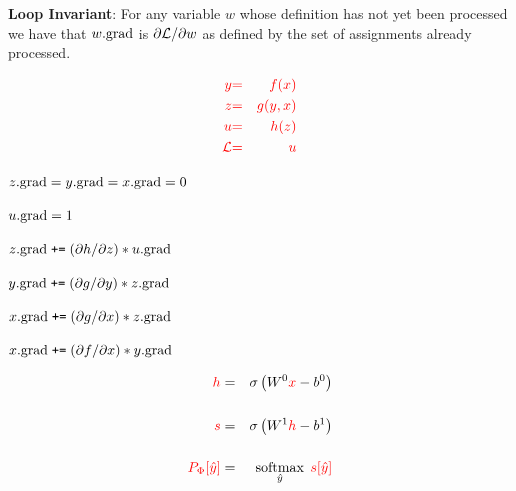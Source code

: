 {{}

\medskip
    {\bf Loop Invariant}: For any variable $w$ whose definition has not yet been processed we have that $w.\mathrm{grad}$ is $\partial {\cal L}/\partial w$ as defined by the set of assignments already processed.

\vspace{-3ex}
\begin{eqnarray*}
  {\color{red} y} & {\color{red} =} & {\color{red} f(x)} \\
  {\color{red} z} & {\color{red} =} & {\color{red} g(y,x)} \\
  {\color{red} u} & {\color{red} =} & {\color{red} h(z)} \\
  {\color{red} {\cal L}} & {\color{red} =} & {\color{red} u}
\end{eqnarray*}
{\color{red}
\medskip
$z.\mathrm{grad} = y.\mathrm{grad} = x.\mathrm{grad} = 0$

\medskip
$u.\mathrm{grad} = 1$

\medskip
$z.\mathrm{grad}\;\mbox{\tt +=}\; ({\partial h}/{\partial z}) * u.\mathrm{grad}$

\medskip
$y.\mathrm{grad} \;\mbox{\tt +=}\; ({\partial g}/{\partial y}) * z.\mathrm{grad}$

\medskip
$x.\mathrm{grad} \;\mbox{\tt +=}\; ({\partial g}/{\partial x}) * z.\mathrm{grad}$

\medskip
$x.\mathrm{grad} \;\mbox{\tt +=}\; ({\partial f}/{\partial x}) * y.\mathrm{grad}$
}



\begin{eqnarray*}
  {\color{red} h} & = & \sigma\left(W^0{\color{red} x} - b^0\right) \\
  \\
  {\color{red} s} & = & \sigma\left(W^1{\color{red} h} - b^1 \right) \\
  \\
  {\color{red} P_\Phi[\hat{y}]} & = & \operatorname*{softmax}_{\hat{y}}\;{\color{red} s[\hat{y}]}
\end{eqnarray*}

}
